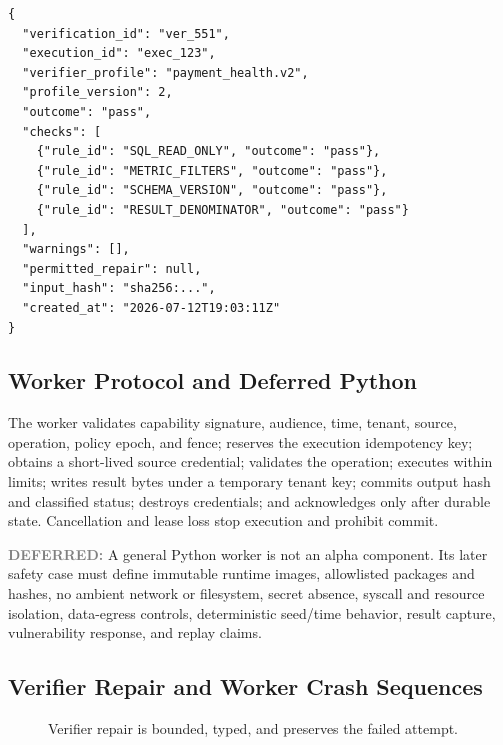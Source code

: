 \documentclass[10pt]{article}
\newcommand{\deferred}{\textbf{\textcolor{gray}{DEFERRED:}}\xspace}
\begin{document}
\begin{lstlisting}[style=contract]
{
  "verification_id": "ver_551",
  "execution_id": "exec_123",
  "verifier_profile": "payment_health.v2",
  "profile_version": 2,
  "outcome": "pass",
  "checks": [
    {"rule_id": "SQL_READ_ONLY", "outcome": "pass"},
    {"rule_id": "METRIC_FILTERS", "outcome": "pass"},
    {"rule_id": "SCHEMA_VERSION", "outcome": "pass"},
    {"rule_id": "RESULT_DENOMINATOR", "outcome": "pass"}
  ],
  "warnings": [],
  "permitted_repair": null,
  "input_hash": "sha256:...",
  "created_at": "2026-07-12T19:03:11Z"
}
\end{lstlisting}

\subsection{Worker Protocol and Deferred Python}

The worker validates capability signature, audience, time, tenant, source, operation, policy epoch, and fence; reserves the execution idempotency key; obtains a short-lived source credential; validates the operation; executes within limits; writes result bytes under a temporary tenant key; commits output hash and classified status; destroys credentials; and acknowledges only after durable state. Cancellation and lease loss stop execution and prohibit commit.

\deferred A general Python worker is not an alpha component. Its later safety case must define immutable runtime images, allowlisted packages and hashes, no ambient network or filesystem, secret absence, syscall and resource isolation, data-egress controls, deterministic seed/time behavior, result capture, vulnerability response, and replay claims.

\subsection{Verifier Repair and Worker Crash Sequences}

\begin{figure}[H]
\centering
{}
\caption{Verifier repair is bounded, typed, and preserves the failed attempt.}
\end{figure}
\end{document}
